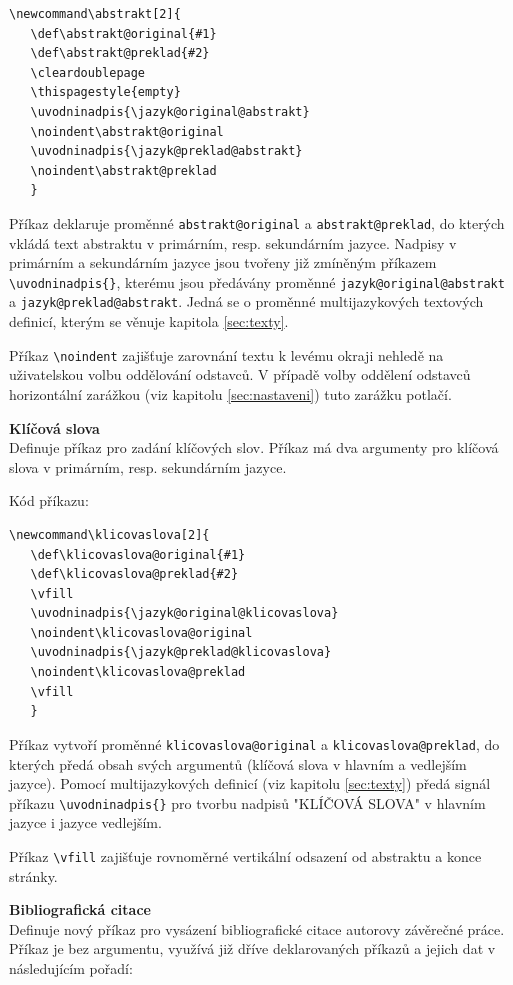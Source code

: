 \begin{verbatim}
\newcommand\abstrakt[2]{
   \def\abstrakt@original{#1}
   \def\abstrakt@preklad{#2}
   \cleardoublepage
   \thispagestyle{empty}
   \uvodninadpis{\jazyk@original@abstrakt}
   \noindent\abstrakt@original
   \uvodninadpis{\jazyk@preklad@abstrakt}
   \noindent\abstrakt@preklad
   }
\end{verbatim} 

Příkaz deklaruje proměnné \verb|abstrakt@original| a \verb|abstrakt@preklad|, do kterých vkládá text abstraktu v primárním, resp. sekundárním jazyce. Nadpisy v primárním a sekundárním jazyce jsou tvořeny již zmíněným příkazem \verb|\uvodninadpis{}|, kterému jsou předávány proměnné \verb|jazyk@original@abstrakt| a \verb|jazyk@preklad@abstrakt|. Jedná se o proměnné multijazykových textových definicí, kterým se věnuje kapitola \ref{sec:texty}.

Příkaz \verb|\noindent| zajišťuje zarovnání textu k levému okraji nehledě na uživatelskou volbu oddělování odstavců. V případě volby oddělení odstavců horizontální zarážkou (viz kapitolu \ref{sec:nastaveni}) tuto zarážku potlačí.

\vspace{8pt}
\textbf{Klíčová slova}\\
Definuje příkaz pro zadání klíčových slov. Příkaz má dva argumenty pro klíčová slova v primárním, resp. sekundárním jazyce.

Kód příkazu:

\begin{verbatim}
\newcommand\klicovaslova[2]{
   \def\klicovaslova@original{#1}
   \def\klicovaslova@preklad{#2}
   \vfill
   \uvodninadpis{\jazyk@original@klicovaslova}
   \noindent\klicovaslova@original
   \uvodninadpis{\jazyk@preklad@klicovaslova}
   \noindent\klicovaslova@preklad
   \vfill
   }
\end{verbatim}

Příkaz vytvoří proměnné \verb|klicovaslova@original| a \verb|klicovaslova@preklad|, do kterých předá obsah svých argumentů (klíčová slova v hlavním a vedlejším jazyce). Pomocí multijazykových definicí (viz kapitolu \ref{sec:texty}) předá signál příkazu \verb|\uvodninadpis{}| pro tvorbu nadpisů "KLÍČOVÁ SLOVA" v hlavním jazyce i jazyce vedlejším.

Příkaz \verb|\vfill| zajišťuje rovnoměrné vertikální odsazení od abstraktu a konce stránky.

\vspace{8pt}
\textbf{Bibliografická citace}\\
Definuje nový příkaz pro vysázení bibliografické citace autorovy závěrečné práce. Příkaz je bez argumentu, využívá již dříve deklarovaných příkazů a jejich dat v následujícím pořadí:

